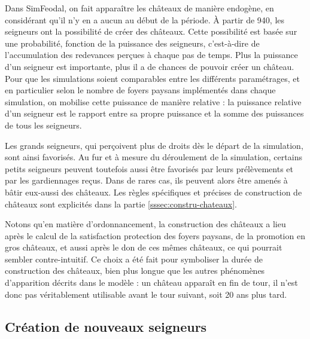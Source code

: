 \begin{tcolorbox}[breakable,left=0pt,right=0pt,top=0pt,bottom=0pt,
	colback=gray!15,colframe=gray!15,width=\dimexpr\textwidth\relax, 
	enlarge left by=0mm, boxsep=5pt,arc=0pt,outer arc=0pt]
	
	Dans SimFeodal, on fait apparaître les châteaux de manière endogène, en considérant qu'il n'y en a aucun au début de la période.
	À partir de 940, les seigneurs ont la possibilité de créer des châteaux.
	Cette possibilité est basée sur une probabilité, fonction de la puissance des seigneurs, c'est-à-dire de l'accumulation des redevances perçues à chaque pas de temps.
	Plus la puissance d'un seigneur est importante, plus il a de chances de pouvoir créer un château.
	Pour que les simulations soient comparables entre les différents paramétrages, et en particulier selon le nombre de foyers paysans implémentés dans chaque simulation, on mobilise cette puissance de manière relative : la puissance relative d'un seigneur est le rapport entre sa propre puissance et la somme des puissances de tous les seigneurs.

	Les grands seigneurs, qui perçoivent plus de droits dès le départ de la simulation, sont ainsi favorisés.
	Au fur et à mesure du déroulement de la simulation, certains petits seigneurs peuvent toutefois aussi être favorisés par leurs prélèvements et par les gardiennages reçus.
	Dans de rares cas, ils peuvent alors être amenés à bâtir eux-aussi des châteaux.
	Les règles spécifiques et précises de construction de châteaux sont explicités dans la partie \cref{sssec:constru-chateaux}.
	
	Notons qu'en matière d'ordonnancement, la construction des châteaux a lieu après le calcul de la \og satisfaction protection\fg{} des foyers paysans, de la promotion en gros châteaux, et aussi après le don de ces mêmes châteaux, ce qui pourrait sembler contre-intuitif.
	Ce choix a été fait pour symboliser la durée de construction des châteaux, bien plus longue que les autres phénomènes d'apparition décrits dans le modèle : un château apparaît en fin de tour, il n'est donc pas véritablement utilisable avant le tour suivant, soit 20 ans plus tard.

\end{tcolorbox}



\subsection{Création de nouveaux seigneurs}

